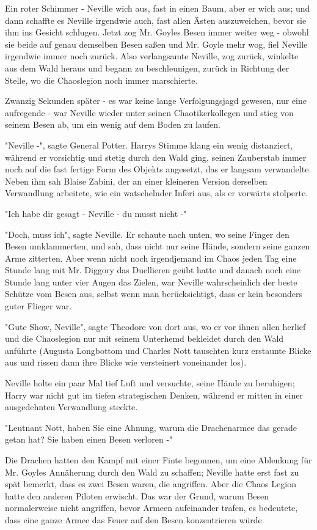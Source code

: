 {Ein roter Schimmer - Neville wich aus, fast in einen Baum, aber er wich aus; und dann schaffte es Neville irgendwie auch, fast allen Ästen auszuweichen, bevor sie ihm ins Gesicht schlugen. Jetzt zog Mr. Goyles Besen immer weiter weg - obwohl sie beide auf genau demselben Besen saßen und Mr. Goyle mehr wog, fiel Neville irgendwie immer noch zurück. Also verlangsamte Neville, zog zurück, winkelte aus dem Wald heraus und begann zu beschleunigen, zurück in Richtung der Stelle, wo die Chaoslegion noch immer marschierte.

Zwanzig Sekunden später - es war keine lange Verfolgungsjagd gewesen, nur eine aufregende - war Neville wieder unter seinen Chaotikerkollegen und stieg von seinem Besen ab, um ein wenig auf dem Boden zu laufen.

"Neville -", sagte General Potter. Harrys Stimme klang ein wenig distanziert, während er vorsichtig und stetig durch den Wald ging, seinen Zauberstab immer noch auf die fast fertige Form des Objekts angesetzt, das er langsam verwandelte. Neben ihm sah Blaise Zabini, der an einer kleineren Version derselben Verwandlung arbeitete, wie ein watschelnder Inferi aus, als er vorwärts stolperte.

"Ich habe dir gesagt - Neville - du musst nicht -"

"Doch, muss ich", sagte Neville. Er schaute nach unten, wo seine Finger den Besen umklammerten, und sah, dass nicht nur seine Hände, sondern seine ganzen Arme zitterten. Aber wenn nicht noch irgendjemand im Chaos jeden Tag eine Stunde lang mit Mr. Diggory das Duellieren geübt hatte und danach noch eine Stunde lang unter vier Augen das Zielen, war Neville wahrscheinlich der beste Schütze vom Besen aus, selbst wenn man berücksichtigt, dass er kein besonders guter Flieger war.

"Gute Show, Neville", sagte Theodore von dort aus, wo er vor ihnen allen herlief und die Chaoslegion nur mit seinem Unterhemd bekleidet durch den Wald anführte (Augusta Longbottom und Charles Nott tauschten kurz erstaunte Blicke aus und rissen dann ihre Blicke wie versteinert voneinander los).

Neville holte ein paar Mal tief Luft und versuchte, seine Hände zu beruhigen; Harry war nicht gut im tiefen strategischen Denken, während er mitten in einer ausgedehnten Verwandlung steckte.

"Leutnant Nott, haben Sie eine Ahnung, warum die Drachenarmee das gerade getan hat? Sie haben einen Besen verloren -"

Die Drachen hatten den Kampf mit einer Finte begonnen, um eine Ablenkung für Mr. Goyles Annäherung durch den Wald zu schaffen; Neville hatte erst fast zu spät bemerkt, dass es zwei Besen waren, die angriffen. Aber die Chaos Legion hatte den anderen Piloten erwischt. Das war der Grund, warum Besen normalerweise nicht angriffen, bevor Armeen aufeinander trafen, es bedeutete, dass eine ganze Armee das Feuer auf den Besen konzentrieren würde.

}
